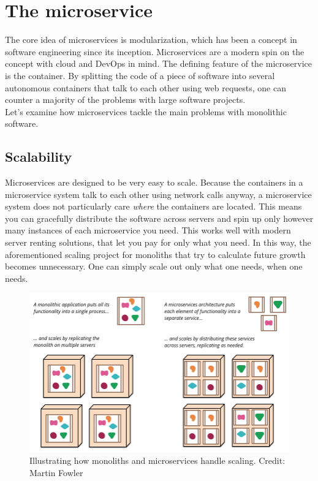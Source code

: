 \section{The microservice}
The core idea of microservices is modularization, which has been a concept in software engineering since its inception.
Microservices are a modern spin on the concept with cloud and DevOps in mind.
The defining feature of the microservice is the container.
By splitting the code of a piece of software into several autonomous containers that talk to each other using web requests,
one can counter a majority of the problems with large software projects. \\
Let's examine how microservices tackle the main problems with monolithic software.

\subsection{Scalability}
Microservices are designed to be very easy to scale.
Because the containers in a microservice system talk to each other using network calls anyway, a microservice system does not particularly care \textit{where} the containers are located.
This means you can gracefully distribute the software across servers and spin up only however many instances of each microservice you need.
This works well with modern server renting solutions, that let you pay for only what you need.
In this way, the aforementioned scaling project for monoliths that try to calculate future growth becomes unnecessary.
One can simply scale out only what one needs, when one needs.

\begin{figure}[ht]
    \centering
    \includegraphics[width=\columnwidth]{Figures/scaling.png}
    \caption{Illustrating how monoliths and microservices handle scaling. Credit: Martin Fowler \cite*{Fowler2014}}
    \label{Scaling-comparison}
\end{figure}

